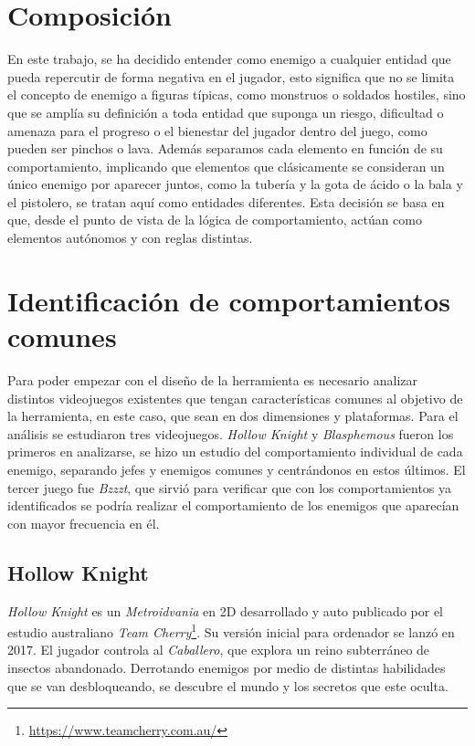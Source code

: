 \section{Composición}
En este trabajo, se ha decidido entender como enemigo a cualquier entidad que pueda repercutir de forma negativa en el jugador, esto significa que no se limita el concepto de enemigo a figuras típicas, como monstruos o soldados hostiles, sino que se amplía su definición a toda entidad que suponga un riesgo, dificultad o amenaza para el progreso o el bienestar del jugador dentro del juego, como pueden ser pinchos o lava.
Además separamos cada elemento en función de su comportamiento, implicando que elementos que clásicamente se consideran un único enemigo por aparecer juntos, como la tubería y la gota de ácido o la bala y el pistolero, se tratan aquí como entidades diferentes. Esta decisión se basa en que, desde el punto de vista de la lógica de comportamiento, actúan como elementos autónomos y con reglas distintas.\\

\section{Identificación de comportamientos comunes}
Para poder empezar con el diseño de la herramienta es necesario analizar distintos videojuegos existentes que tengan características comunes al objetivo de la herramienta, en este caso, que sean en dos dimensiones y plataformas.
Para el análisis se estudiaron tres videojuegos. \textit{Hollow Knight} y \textit{Blasphemous} fueron los primeros en analizarse, se hizo un estudio del comportamiento individual de cada enemigo, separando jefes y enemigos comunes y centrándonos en estos últimos. El tercer juego fue \textit{Bzzzt}, que sirvió para verificar que con los comportamientos ya identificados se podría realizar el comportamiento de los enemigos que aparecían con mayor frecuencia en él. 

\subsection{Hollow Knight}
\textit{Hollow Knight} es un \emph{Metroidvania} en 2D desarrollado y auto publicado por el estudio australiano \emph{Team Cherry}\footnote{\url{https://www.teamcherry.com.au/}}. Su versión inicial para ordenador se lanzó en 2017. El jugador controla al \textit{Caballero}, que explora un reino subterráneo de insectos abandonado. Derrotando enemigos por medio de distintas habilidades que se van desbloqueando, se descubre el mundo y los secretos que este oculta.

